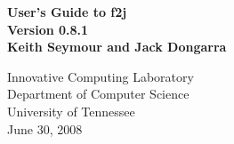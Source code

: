 \thispagestyle{empty}
\begin{center}
\huge
\bf
User's Guide to f2j \\
Version 0.8.1
\vspace*{1in} \mbox{} \\
\LARGE \rm
Keith Seymour and Jack Dongarra 

\vspace*{.5in}
Innovative Computing Laboratory\\
Department of Computer Science\\
University of Tennessee\\
\vspace*{.5in}
June 30, 2008
\end{center}
